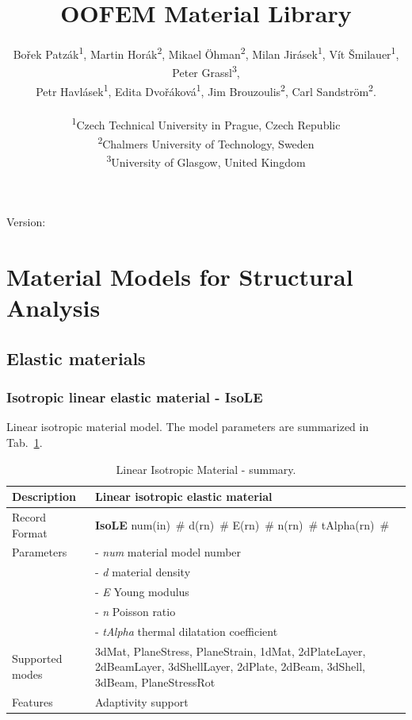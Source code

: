 \documentclass[a4paper]{article}
\newcommand{\descitem}[1]{{\noindent \bf #1}}
\newcommand{\elemparam}[2]{{{#1\tiny (#2)}~\#}}
\newcommand{\param}[1]{{\it #1}}
\newenvironment{mmt}{\begin{tabular}{|l|p{9cm}|}}{\end{tabular}\\}
\newenvironment{mmt}{\begin{tabular}{|l|l|}}{\end{tabular}\\}
\begin{document}
\title{OOFEM Material Library}
\author{
  Bořek Patzák\textsuperscript{1},
  Martin Horák\textsuperscript{2},
  Mikael Öhman\textsuperscript{2},
  Milan Jirásek\textsuperscript{1},
  Vít Šmilauer\textsuperscript{1},
  Peter Grassl\textsuperscript{3},\\
  Petr Havlásek\textsuperscript{1},
  Edita Dvořáková\textsuperscript{1},
  Jim Brouzoulis\textsuperscript{2},
  Carl Sandström\textsuperscript{2}.\\ \\
  \textsuperscript{1}Czech Technical University in Prague, Czech Republic\\
  \textsuperscript{2}Chalmers University of Technology, Sweden\\
  \textsuperscript{3}University of Glasgow, United Kingdom 
}

\maketitle
\begin{center}
  Version: \version
\end{center}

\newpage
\tableofcontents
\listoftables
\newpage
\section{Material Models for Structural Analysis}
\subsection{Elastic materials}
\subsubsection{Isotropic linear elastic material - IsoLE}
\label{IsoLE}
Linear isotropic material model. The model parameters are summarized
in Tab.~\ref{IsoLE_table}.

\begin{table}[!htb]
\begin{mmt}
\hline
Description & Linear isotropic elastic material\\
\hline
Record Format & \descitem{IsoLE} \elemparam{num}{in}
\elemparam{d}{rn} \elemparam{E}{rn} \elemparam{n}{rn}
\elemparam{tAlpha}{rn}\\
Parameters &- \param{num} material model number\\
&- \param{d} material density\\
&- \param{E} Young modulus\\
&- \param{n} Poisson ratio\\
&- \param{tAlpha} thermal dilatation coefficient\\
Supported modes& 3dMat, PlaneStress, PlaneStrain, 1dMat,
2dPlateLayer, 2dBeamLayer, 3dShellLayer, 2dPlate, 2dBeam, 3dShell,
3dBeam, PlaneStressRot\\
Features & Adaptivity support\\
\hline
\end{mmt}
\caption{Linear Isotropic Material - summary.}
\label{IsoLE_table}
\end{table}
\end{document}

